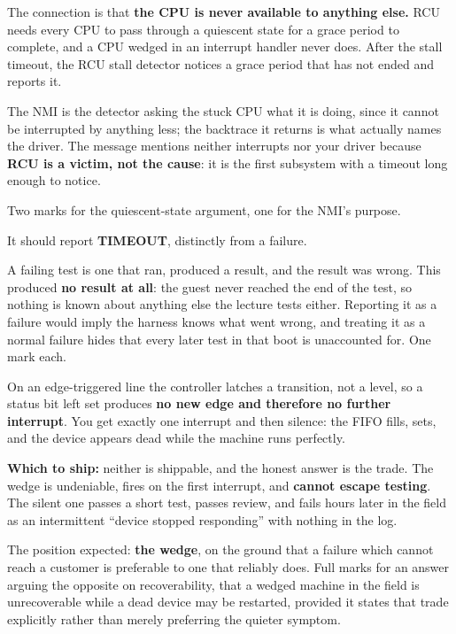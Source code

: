 The connection is that \textbf{the CPU is never available to anything else.} RCU needs every CPU to
pass through a quiescent state for a grace period to complete, and a CPU wedged in an interrupt
handler never does. After the stall timeout, the RCU stall detector notices a grace period that has
not ended and reports it.

The NMI is the detector asking the stuck CPU what it is doing, since it cannot be interrupted by
anything less; the backtrace it returns is what actually names the driver. The message mentions
neither interrupts nor your driver because \textbf{RCU is a victim, not the cause}: it is the first
subsystem with a timeout long enough to notice.

Two marks for the quiescent-state argument, one for the NMI's purpose.

It should report \textbf{TIMEOUT}, distinctly from a failure.

A failing test is one that ran, produced a result, and the result was wrong. This produced
\textbf{no result at all}: the guest never reached the end of the test, so nothing is known about
anything else the lecture tests either. Reporting it as a failure would imply the harness knows what
went wrong, and treating it as a normal failure hides that every later test in that boot is
unaccounted for. One mark each.

On an edge-triggered line the controller latches a transition, not a level, so a status bit left set
produces \textbf{no new edge and therefore no further interrupt}. You get exactly one interrupt and
then silence: the FIFO fills,  sets, and the device appears dead while the machine
runs perfectly.

\textbf{Which to ship:} neither is shippable, and the honest answer is the trade. The wedge is
undeniable, fires on the first interrupt, and \textbf{cannot escape testing}. The silent one passes
a short test, passes review, and fails hours later in the field as an intermittent ``device stopped
responding'' with nothing in the log.

The position expected: \textbf{the wedge}, on the ground that a failure which cannot reach a
customer is preferable to one that reliably does. Full marks for an answer arguing the opposite on
recoverability, that a wedged machine in the field is unrecoverable while a dead device may be
restarted, provided it states that trade explicitly rather than merely preferring the quieter
symptom.


